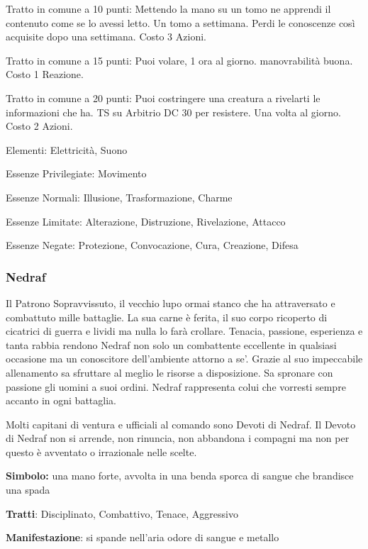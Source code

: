 \documentclass[a4paper,11pt,twoside,openany]{book}
\begin{document}
Tratto in comune a 10 punti: Mettendo la mano su un tomo ne apprendi il contenuto come se lo avessi letto. Un tomo a settimana. Perdi le conoscenze così acquisite dopo una settimana. Costo 3 Azioni.

Tratto in comune a 15 punti: Puoi volare, 1 ora al giorno. manovrabilità buona. Costo 1 Reazione.

Tratto in comune a 20 punti: Puoi costringere una creatura a rivelarti le informazioni che ha. TS su Arbitrio DC 30 per resistere. Una volta al giorno. Costo 2 Azioni.

\bigskip

Elementi: Elettricità, Suono

\bigskip

Essenze Privilegiate: Movimento

Essenze Normali: Illusione, Trasformazione, Charme

Essenze Limitate: Alterazione, Distruzione, Rivelazione, Attacco

Essenze Negate: Protezione, Convocazione, Cura, Creazione, Difesa

\subsubsection{Nedraf}

\label{nedraf}

Il Patrono Sopravvissuto, il vecchio lupo ormai stanco che ha attraversato e combattuto mille battaglie. La sua carne è ferita, il suo corpo ricoperto di cicatrici di guerra e lividi ma nulla lo farà crollare. Tenacia, passione, esperienza e tanta rabbia rendono Nedraf non solo un combattente eccellente in qualsiasi occasione ma un conoscitore dell'ambiente attorno a se'. Grazie al suo impeccabile allenamento sa sfruttare al meglio le risorse a disposizione. Sa spronare con passione gli uomini a suoi ordini.
Nedraf rappresenta colui che vorresti sempre accanto in ogni battaglia.

Molti capitani di ventura e ufficiali al comando sono Devoti di Nedraf. Il Devoto di Nedraf non si arrende, non rinuncia, non abbandona i compagni ma non per questo è avventato o irrazionale nelle scelte.

\textbf{Simbolo:} una mano forte, avvolta in una benda sporca di sangue
che brandisce una spada

\textbf{Tratti}: Disciplinato, Combattivo, Tenace, Aggressivo

\textbf{Manifestazione}: si spande nell'aria odore di sangue e metallo
\end{document}
